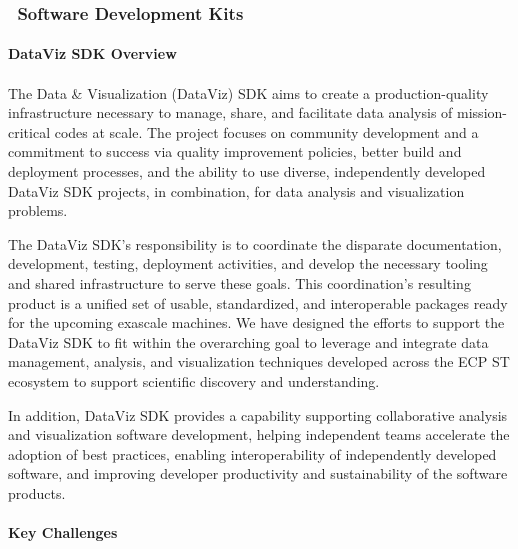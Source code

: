 \subsubsection{ \dataviz\ Software Development Kits} 

\paragraph{\textbf{DataViz SDK Overview}}
\paragraph{}

The Data \& Visualization (DataViz) SDK aims to create a production-quality infrastructure necessary to manage, share, and facilitate data analysis of mission-critical codes at scale. The project focuses on community development and a commitment to success via quality improvement policies, better build and deployment processes, and the ability to use diverse, independently developed DataViz SDK projects, in combination, for data analysis and visualization problems.

The DataViz SDK's responsibility is to coordinate the disparate documentation, development, testing, deployment activities, and develop the necessary tooling and shared infrastructure to serve these goals. This coordination's resulting product is a unified set of usable, standardized, and interoperable packages ready for the upcoming exascale machines. We have designed the efforts to support the DataViz SDK to fit within the overarching goal to leverage and integrate data management, analysis, and visualization techniques developed across the ECP ST ecosystem to support scientific discovery and understanding.

In addition, DataViz SDK provides a capability supporting collaborative analysis and visualization software development, helping independent teams accelerate the adoption of best practices, enabling interoperability of independently developed software, and improving developer productivity and sustainability of the software products.

\paragraph{\textbf{Key Challenges}}
\paragraph{}

